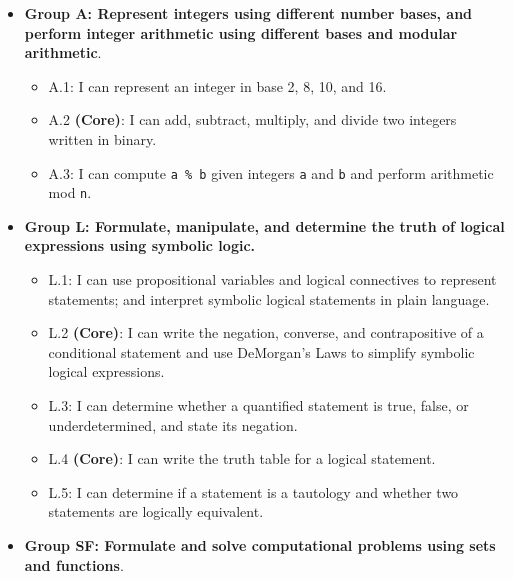 \documentclass[]{article}
\providecommand{\tightlist}{%
  \setlength{\itemsep}{0pt}\setlength{\parskip}{0pt}}
\begin{document}
\begin{itemize}
\tightlist
\item
  \textbf{Group A: Represent integers using different number bases, and
  perform integer arithmetic using different bases and modular
  arithmetic}.

  \begin{itemize}
  \tightlist
  \item
    A.1: I can represent an integer in base 2, 8, 10, and 16.
  \item
    A.2 \textbf{(Core)}: I can add, subtract, multiply, and divide two
    integers written in binary.
  \item
    A.3: I can compute \texttt{a\ \%\ b} given integers \texttt{a} and
    \texttt{b} and perform arithmetic mod \texttt{n}.\\
  \end{itemize}
\item
  \textbf{Group L: Formulate, manipulate, and determine the truth of
  logical expressions using symbolic logic.}

  \begin{itemize}
  \tightlist
  \item
    L.1: I can use propositional variables and logical connectives to
    represent statements; and interpret symbolic logical statements in
    plain language.
  \item
    L.2 \textbf{(Core)}: I can write the negation, converse, and
    contrapositive of a conditional statement and use DeMorgan's Laws to
    simplify symbolic logical expressions.
  \item
    L.3: I can determine whether a quantified statement is true, false,
    or underdetermined, and state its negation.
  \item
    L.4 \textbf{(Core)}: I can write the truth table for a logical
    statement.
  \item
    L.5: I can determine if a statement is a tautology and whether two
    statements are logically equivalent.
  \end{itemize}
\item
  \textbf{Group SF: Formulate and solve computational problems using
  sets and functions}.


\end{itemize}
\end{document}
